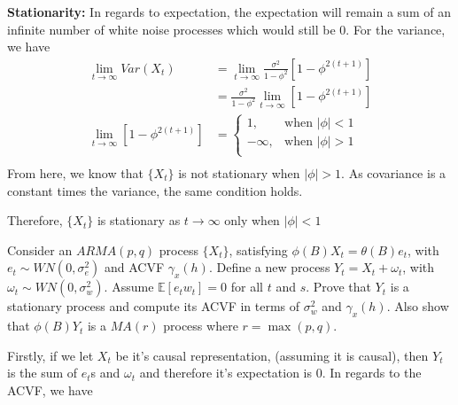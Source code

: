 \documentclass[10pt,a4paper]{exam}
\begin{document}
\begin{questions}
\begin{solution}
\textbf{Stationarity:}
In regards to expectation, the expectation will remain a sum of an infinite number of white noise processes which would still be 0. For the variance, we have
\begin{align*}
\lim_{t \to \infty} Var(X_t)		&=  \lim_{t \to \infty} \frac{\sigma^2}{1 - \phi^2}\left[1 - \phi^{2(t+1)}\right]\\
											&=  \frac{\sigma^2}{1 - \phi^2}\lim_{t \to \infty}\left[1 - \phi^{2(t+1)}\right]\\
\lim_{t \to \infty}\left[1 - \phi^{2(t+1)}\right]			&= \begin{cases}
																				1,	& \text{when }|\phi| < 1\\
																				-\infty,	& \text{when } |\phi| > 1\\
																			\end{cases}\\
\end{align*}
From here, we know that $\{X_t\}$ is not stationary when $|\phi| > 1$. As covariance is a constant times the variance, the same condition holds. 

Therefore, $\{X_t\}$ is stationary as $t \to \infty$ only when $|\phi| < 1$
\end{solution}
\pagebreak

































\question Consider an $ARMA(p,q)$ process $\{X_t\}$, satisfying $\phi(B)X_t = \theta(B)e_t$, with $e_t \sim WN(0, \sigma_e^2)$ and ACVF $\gamma_x(h)$. Define a new process $Y_t = X_t + \omega_t$, with $\omega_t \sim WN(0, \sigma_w^2)$. Assume $\mathbb{E}[e_tw_t] = 0$ for all $t$ and $s$. Prove that $Y_t$ is a stationary process and compute its ACVF in terms of $\sigma^2_w$ and $\gamma_x(h)$. Also show that $\phi(B)Y_t$ is a $MA(r)$ process where $r = \max(p,q)$.

\begin{solution}
Firstly, if we let $X_t$ be it's causal representation, (assuming it is causal), then $Y_t$ is the sum of $e_t$s and $\omega_t$ and therefore it's expectation is 0. In regards to the ACVF, we have


\end{solution}
\end{questions}
\end{document}
